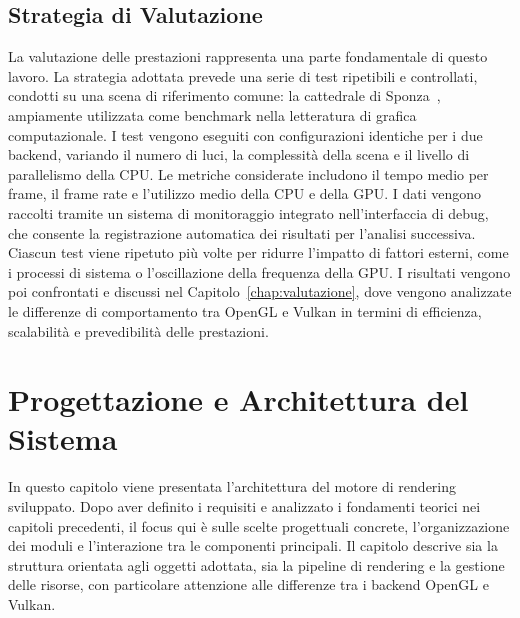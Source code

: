 \documentclass[12pt,a4paper,openright,twoside]{book}
\begin{document}
\section{Strategia di Valutazione}
La valutazione delle prestazioni rappresenta una parte fondamentale di questo lavoro. La strategia adottata prevede
una serie di test ripetibili e controllati, condotti su una scena di riferimento comune: la cattedrale di
Sponza~\cite{sponza_original,sponza_intel2022}, ampiamente utilizzata come benchmark nella letteratura di grafica
computazionale. I test vengono eseguiti con configurazioni identiche per i due backend, variando il numero di luci,
la complessità della scena e il livello di parallelismo della CPU.
Le metriche considerate includono il tempo medio per frame, il frame rate e l'utilizzo medio della CPU e della GPU.
I dati vengono raccolti tramite un sistema di monitoraggio integrato nell'interfaccia di debug, che consente la
registrazione automatica dei risultati per l'analisi successiva.
Ciascun test viene ripetuto più volte per ridurre l'impatto di fattori esterni, come i processi di sistema o
l'oscillazione della frequenza della GPU. I risultati vengono poi confrontati e discussi nel
Capitolo~\ref{chap:valutazione}, dove vengono analizzate le differenze di comportamento tra OpenGL e Vulkan in termini
di efficienza, scalabilità e prevedibilità delle prestazioni.

\chapter{Progettazione e Architettura del Sistema}
\label{chap:design}
\noindent
In questo capitolo viene presentata l'architettura del motore di rendering sviluppato. Dopo aver definito i requisiti
e analizzato i fondamenti teorici nei capitoli precedenti, il focus qui è sulle scelte progettuali concrete,
l'organizzazione dei moduli e l'interazione tra le componenti principali. Il capitolo descrive sia la struttura
orientata agli oggetti adottata, sia la pipeline di rendering e la gestione delle risorse, con particolare attenzione
alle differenze tra i backend OpenGL e Vulkan.
\end{document}

